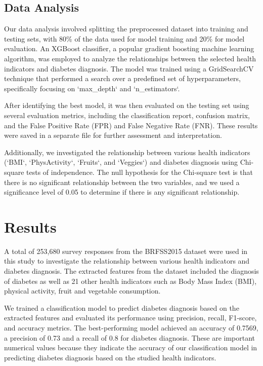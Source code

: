 \documentclass[12pt]{article}
\begin{document}
\subsection{Data Analysis}
Our data analysis involved splitting the preprocessed dataset into training and testing sets, with 80\% of the data used for model training and 20\% for model evaluation. An XGBoost classifier, a popular gradient boosting machine learning algorithm, was employed to analyze the relationships between the selected health indicators and diabetes diagnosis. The model was trained using a GridSearchCV technique that performed a search over a predefined set of hyperparameters, specifically focusing on `max\_depth` and `n\_estimators`.

After identifying the best model, it was then evaluated on the testing set using several evaluation metrics, including the classification report, confusion matrix, and the False Positive Rate (FPR) and False Negative Rate (FNR). These results were saved in a separate file for further assessment and interpretation.

Additionally, we investigated the relationship between various health indicators (`BMI`, `PhysActivity`, `Fruits`, and `Veggies`) and diabetes diagnosis using Chi-square tests of independence. The null hypothesis for the Chi-square test is that there is no significant relationship between the two variables, and we used a significance level of 0.05 to determine if there is any significant relationship.

\section{Results}

A total of 253,680 survey responses from the BRFSS2015 dataset were used in this study to investigate the relationship between various health indicators and diabetes diagnosis. The extracted features from the dataset included the diagnosis of diabetes as well as 21 other health indicators such as Body Mass Index (BMI), physical activity, fruit and vegetable consumption.

We trained a classification model to predict diabetes diagnosis based on the extracted features and evaluated its performance using precision, recall, F1-score, and accuracy metrics. The best-performing model achieved an accuracy of 0.7569, a precision of 0.73 and a recall of 0.8 for diabetes diagnosis. These are important numerical values because they indicate the accuracy of our classification model in predicting diabetes diagnosis based on the studied health indicators.
\end{document}
